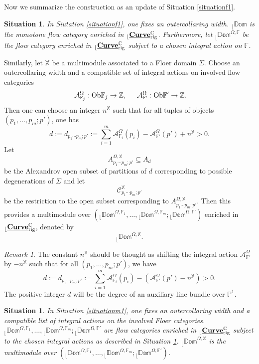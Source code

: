 \documentclass[reqno, 10pt]{amsart}
\numberwithin{equation}{section}
\numberwithin{equation}{section}
\newtheorem{situationf}{Situation}
\newtheorem{situationm}{Situation}
\renewcommand{\subset}{\subseteq}
\theoremstyle{definition}
\theoremstyle{remark}
\newtheorem{rem}[thm]{Remark}
\newcommand{\beq}{\begin{equation}}
\newcommand{\eeq}{\end{equation}}
\newcommand{\beqn}{\begin{equation*}}
\newcommand{\eeqn}{\end{equation*}}
\newcommand{\mb}{\mathbb}
\newcommand{\mc}{\mathcal}
\renewcommand{\outer}{{}_{\lfloor}}
\newcommand{\uds}[1]{\underline{\smash{#1}}}
\begin{document}
Now we summarize the construction as an update of Situation \ref{situationf1}.

\begin{situationf}\label{situationf2}
In Siutation \ref{situationf1}, one fixes an outercollaring width. $\outer \mb{Dom}$ is the monotone flow category enriched in $\outer \uds{\bf Curve}_{\rm rig}^{\mb C}$. Furthermore, let $\outer \mb{Dom}^{\Omega, {\mb F}}$ be the flow category enriched in $\outer \uds{\bf Curve}_{\rm rig}^{\mb C}$ subject to a chosen integral action on ${\mb F}$.
\end{situationf}



Similarly, let ${\mb X}$ be a multimodule associated to a Floer domain $\Sigma$. Choose an outercollaring width and a compatible set of integral actions on involved flow categories 
\begin{align*}
&\ {\mc A}_{{\mb F}_j}^\Omega: {\rm Ob}{\mb F}_j \to {\mb Z},\ &\ {\mc A}_{{\mb F}'}^\Omega: {\rm Ob}{\mb F}' \to {\mb Z}.
\end{align*}
Then one can choose an integer $n^{\mb X}$ such that for all tuples of objects $(p_1, \ldots, p_m; p')$, one has
\beq\label{eqn:constant-shift}
d:= d_{p_1 \cdots p_m; p'}:= \sum_{i=1}^m {\mc A}^\Omega_{{\mb F}_i}(p_i) - {\mc A}^\Omega_{{\mb F}'}(p') + n^{\mb X} > 0.
\eeq
Let 
\beqn
A_{p_1 \cdots p_m; p'}^{\Omega, {\mb X}} \subset 
A_d
\eeqn
be the Alexandrov open subset of partitions of $d$ corresponding to possible degenerations of $\Sigma$ and let 
\beqn
{\mc C}_{p_1\cdots p_m; p'}^{\mb X}
\eeqn
be the restriction to the open subset corresponding to $A_{p_1 \cdots p_m; p'}^{\Omega, \mb{X}}$. Then this provides a multimodule over $(\outer \mb{Dom}^{\Omega, {\mb F}_1}, \ldots, \outer \mb{Dom}^{\Omega, {\mb F}_m}; \outer \mb{Dom}^{\Omega, {\mb F}'} )$ enriched in $\outer \uds{\bf Curve}_{\rm rig}^{\mb C}$, denoted by 
\beqn
\outer \mb{Dom}^{\Omega, {\mb X}}.
\eeqn

\begin{rem}
    The constant $n^{\mb X}$ should be thought as shifting the integral action ${\mc A}^{\Omega}_{\mb F'}$ by $-n^{\mb X}$ such that for all $(p_1, \ldots, p_m; p')$, we have
\beqn
d:= d_{p_1 \cdots p_m; p'}:= \sum_{i=1}^m {\mc A}^\Omega_{{\mb F}_i}(p_i) - ({\mc A}^\Omega_{{\mb F}'}(p') - n^{\mb X}) > 0.
\eeqn
The positive integer $d$ will be the degree of an auxiliary line bundle over ${\mb P}^1$.
\end{rem}

\begin{situationm}\label{situationm2}
In Situation \ref{situationm1}, one fixes an outercollaring width and a compatible list of integral actions on the involved Floer categories. $\outer \mb{Dom}^{\Omega, {\mb F}_1}, \ldots, \outer \mb{Dom}^{\Omega, {\mb F}_m}; \outer \mb{Dom}^{\Omega, {\mb F}'}$ are flow categories enriched in $\outer \uds{\bf Curve}_{\rm rig}^{\mb C}$ subject to the chosen integral actions as described in Situation \ref{situationf2}. $\outer \mb{Dom}^{\Omega, {\mb X}}$ is the multimodule over $(\outer \mb{Dom}^{\Omega, {\mb F}_1}, \ldots, \outer \mb{Dom}^{\Omega, {\mb F}_m}; \outer \mb{Dom}^{\Omega, {\mb F}'})$.
\end{situationm}
\end{document}
